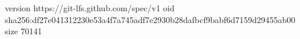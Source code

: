 version https://git-lfs.github.com/spec/v1
oid sha256:df27e041312230e53a4f7a745adf7e2930b28dafbcf9babf6d7159d29455ab00
size 70141
